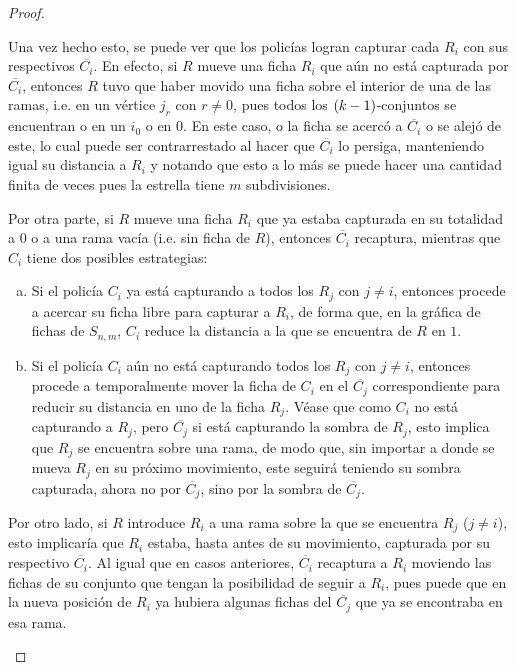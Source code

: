 \begin{proof}
\begin{enumerate}
            Una vez hecho esto, se puede ver que los polic\'ias logran capturar
            cada $R_i$ con sus respectivos $\overline{C_i}$. En efecto, si $R$
            mueve una ficha $R_i$ que a\'un no est\'a capturada por
            $\overline{C_i}$, entonces $R$ tuvo que haber movido una ficha sobre
            el interior de una de las ramas, i.e. en un v\'ertice $j_r$ con
            $r\neq 0$, pues todos los $\left( k-1\right)$-conjuntos se encuentran o en
            un $i_0$ o en $0$. En este caso, o la ficha se acerc\'o a
            $\overline{C_i}$ o se alej\'o de este, lo cual puede ser
            contrarrestado al hacer que $\overline{C_i}$ lo persiga, manteniendo
            igual su distancia a $R_i$ y notando que esto a lo m\'as se puede
            hacer una cantidad finita de veces pues la estrella tiene $m$
            subdivisiones.
            
            Por otra parte, si $R$ mueve una ficha $R_i$ que ya estaba capturada
            en su totalidad a $0$ o a una rama vac\'ia (i.e. sin ficha de $R$),
            entonces $\overline{C_i}$ recaptura, mientras que $C_i$ tiene dos
            posibles estrategias:
            \begin{enumerate}[(a)]
                \item Si el polic\'ia $C_i$ ya est\'a capturando a todos los
                $R_j$ con $j\neq i$, entonces procede a acercar su ficha libre
                para capturar a $R_i$, de forma que, en la gr\'afica de fichas
                de $S_{n,m}$, $C_i$ reduce la distancia a la que se encuentra de
                $R$ en $1$.
                \item Si el polic\'ia $C_i$ a\'un no est\'a capturando todos los
                $R_j$ con $j\neq i$, entonces procede a temporalmente mover la
                ficha de $C_i$ en el $\overline{C_j}$ correspondiente para
                reducir su distancia en uno de la ficha $R_j$. V\'ease que como
                $C_i$ no est\'a capturando a $R_j$, pero $\overline{C_j}$ si
                est\'a capturando la sombra de $R_j$, esto implica que $R_j$ se
                encuentra sobre una rama, de modo que, sin importar a donde se
                mueva $R_j$ en su pr\'oximo movimiento, este seguir\'a teniendo
                su sombra capturada, ahora no por $\overline{C_j}$, sino por la
                sombra de $\overline{C_j}$.
            \end{enumerate}
            
            Por otro lado, si $R$ introduce $R_i$ a una rama sobre la que se
            encuentra $R_j$ ($j\neq i$), esto implicar\'ia que $R_i$ estaba,
            hasta antes de su movimiento, capturada por su respectivo
            $\overline{C_i}$. Al igual que en casos anteriores, $\overline{C_i}$
            recaptura a $R_i$ moviendo las fichas de su conjunto que tengan la
            posibilidad de seguir a $R_i$, pues puede que en la nueva posici\'on
            de $R_i$ ya hubiera algunas fichas del $\overline{C_j}$ que ya se
            encontraba en esa rama. 
            

\end{enumerate}
\end{proof}
